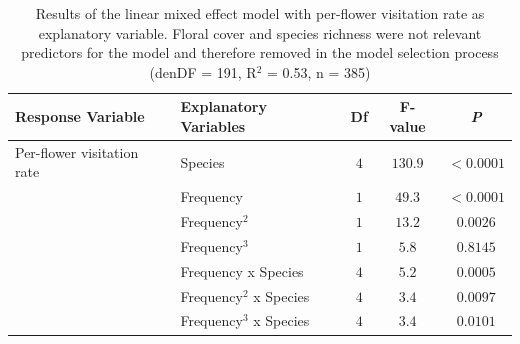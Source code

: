 \begin{table} [htbp] %
	\centering
	\caption{Results of the linear mixed effect model with per-flower visitation rate as explanatory variable. Floral cover and species richness were not relevant predictors for the model and therefore removed in the model selection process (denDF = 191, R$^{2}$ = 0.53, n = 385)}
	\begin{tabular} { l l c c c}
		\toprule
		\textbf{Response Variable} & \textbf{Explanatory Variables} & \textbf{Df} & \textbf{F-value} & \textbf{\textit{P}} \\
		\midrule
		Per-flower visitation rate   & Species & $4$ & $130.9$ & $<0.0001$\\
		& Frequency 			&  $1$ & $49.3$ & $<0.0001$ \\
		& Frequency$^{2}$ 		&  $1$ & $13.2$ & $0.0026$ \\
		& Frequency$^{3}$ 		&  $1$ & $ 5.8$ &  $0.8145$ \\
		& Frequency x Species &  $4$ & $ 5.2$ &  $0.0005$ \\
		& Frequency$^{2}$ x Species & $4$ & $3.4$ & $0.0097$\\
		& Frequency$^{3}$ x Species & $4$ & $3.4$ & $0.0101$\\
		\bottomrule
	\end{tabular}
	\label{tab:anova}
\end{table}


